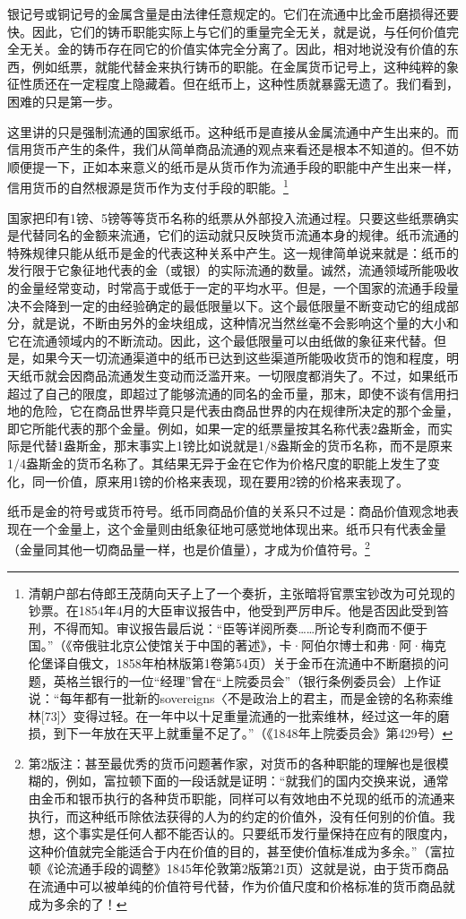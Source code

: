 \documentclass{ctexbook}
\begin{document}
        银记号或铜记号的金属含量是由法律任意规定的。它们在流通中比金币磨损得还要快。因此，它们的铸币职能实际上与它们的重量完全无关，就是说，与任何价值完全无关。金的铸币存在同它的价值实体完全分离了。因此，相对地说没有价值的东西，例如纸票，就能代替金来执行铸币的职能。在金属货币记号上，这种纯粹的象征性质还在一定程度上隐藏着。但在纸币上，这种性质就暴露无遗了。我们看到，困难的只是第一步。
        
        这里讲的只是强制流通的国家纸币。这种纸币是直接从金属流通中产生出来的。而信用货币产生的条件，我们从简单商品流通的观点来看还是根本不知道的。但不妨顺便提一下，正如本来意义的纸币是从货币作为流通手段的职能中产生出来一样，信用货币的自然根源是货币作为支付手段的职能。\footnote{清朝户部右侍郎王茂荫向天子上了一个奏折，主张暗将官票宝钞改为可兑现的钞票。在1854年4月的大臣审议报告中，他受到严厉申斥。他是否因此受到笞刑，不得而知。审议报告最后说：“臣等详阅所奏……所论专利商而不便于国。”（《帝俄驻北京公使馆关于中国的著述》，卡·阿伯尔博士和弗·阿·梅克伦堡译自俄文，1858年柏林版第1卷第54页）关于金币在流通中不断磨损的问题，英格兰银行的一位“经理”曾在“上院委员会”（银行条例委员会）上作证说：“每年都有一批新的sovereigns〈不是政治上的君主，而是金镑的名称索维林[73]〉变得过轻。在一年中以十足重量流通的一批索维林，经过这一年的磨损，到下一年放在天平上就重量不足了。”（《1848年上院委员会》第429号）}
        
        国家把印有1镑、5镑等等货币名称的纸票从外部投入流通过程。只要这些纸票确实是代替同名的金额来流通，它们的运动就只反映货币流通本身的规律。纸币流通的特殊规律只能从纸币是金的代表这种关系中产生。这一规律简单说来就是：纸币的发行限于它象征地代表的金（或银）的实际流通的数量。诚然，流通领域所能吸收的金量经常变动，时常高于或低于一定的平均水平。但是，一个国家的流通手段量决不会降到一定的由经验确定的最低限量以下。这个最低限量不断变动它的组成部分，就是说，不断由另外的金块组成，这种情况当然丝毫不会影响这个量的大小和它在流通领域内的不断流动。因此，这个最低限量可以由纸做的象征来代替。但是，如果今天一切流通渠道中的纸币已达到这些渠道所能吸收货币的饱和程度，明天纸币就会因商品流通发生变动而泛滥开来。一切限度都消失了。不过，如果纸币超过了自己的限度，即超过了能够流通的同名的金币量，那末，即使不谈有信用扫地的危险，它在商品世界毕竟只是代表由商品世界的内在规律所决定的那个金量，即它所能代表的那个金量。例如，如果一定的纸票量按其名称代表2盎斯金，而实际是代替1盎斯金，那末事实上1镑比如说就是1/8盎斯金的货币名称，而不是原来1/4盎斯金的货币名称了。其结果无异于金在它作为价格尺度的职能上发生了变化，同一价值，原来用1镑的价格来表现，现在要用2镑的价格来表现了。
        
        纸币是金的符号或货币符号。纸币同商品价值的关系只不过是：商品价值观念地表现在一个金量上，这个金量则由纸象征地可感觉地体现出来。纸币只有代表金量（金量同其他一切商品量一样，也是价值量），才成为价值符号。\footnote{第2版注：甚至最优秀的货币问题著作家，对货币的各种职能的理解也是很模糊的，例如，富拉顿下面的一段话就是证明：“就我们的国内交换来说，通常由金币和银币执行的各种货币职能，同样可以有效地由不兑现的纸币的流通来执行，而这种纸币除依法获得的人为的约定的价值外，没有任何别的价值。我想，这个事实是任何人都不能否认的。只要纸币发行量保持在应有的限度内，这种价值就完全能适合于内在价值的目的，甚至使价值标准成为多余。”（富拉顿《论流通手段的调整》1845年伦敦第2版第21页）这就是说，由于货币商品在流通中可以被单纯的价值符号代替，作为价值尺度和价格标准的货币商品就成为多余的了！}
        
\end{document}
